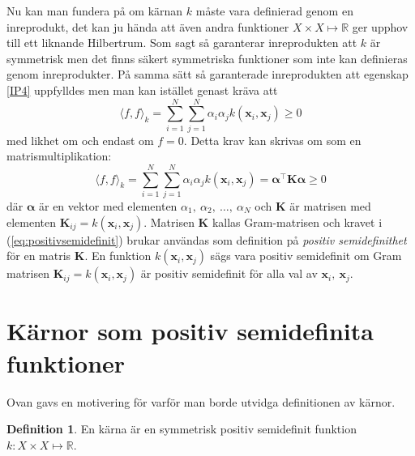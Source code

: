 \documentclass[a4paper, 12pt]{report}
\theoremstyle{definition}
\newtheorem{defi}{Definition}[section]
\theoremstyle{remark}
\newcommand{\bfx}{\mathbf{x}}
\begin{document}
Nu kan man fundera på om kärnan $k$ måste vara definierad genom en inreprodukt, det kan ju hända att även andra funktioner $X \times X \longmapsto \mathbb{R}$ ger upphov till ett liknande Hilbertrum. Som sagt så garanterar inreprodukten att $k$ är symmetrisk men det finns säkert symmetriska funktioner som inte kan definieras genom inreprodukter. På samma sätt så garanterade inreprodukten att egenskap \ref{IP4} uppfylldes men man kan istället genast kräva att
\begin{equation*}
	\langle f, f \rangle_k = \sum_{i=1}^{N}\sum_{j=1}^{N}\alpha_i\alpha_jk\left(\bfx_i,\bfx_j\right) \geq 0
\end{equation*}
med likhet om och endast om $f=0$. Detta krav kan skrivas om som en matrismultiplikation:
\begin{equation}\label{eq:positivsemidefinit}
\langle f, f \rangle_k = \sum_{i=1}^{N}\sum_{j=1}^{N}\alpha_i\alpha_jk\left(\bfx_i,\bfx_j\right) = \boldsymbol{\alpha}^\intercal \mathbf{K} \boldsymbol{\alpha}\geq 0
\end{equation}
där $\boldsymbol{\alpha}$ är en vektor med elementen $\alpha_1,~\alpha_2,~\dots,~\alpha_N$ och $\mathbf{K}$ är matrisen med elementen $\mathbf{K}_{ij}=k\left(\bfx_i,\bfx_j\right)$. Matrisen $\mathbf{K}$ kallas Gram-matrisen och kravet i (\ref{eq:positivsemidefinit}) brukar användas som definition på \emph{positiv semidefinithet} för en matris $\mathbf{K}$. En funktion $k\left(\bfx_i, \bfx_j\right)$ sägs vara positiv semidefinit om Gram matrisen $\mathbf{K}_{ij}=k\left(\bfx_i,\bfx_j\right)$ är positiv semidefinit för alla val av $\bfx_i,~\bfx_j$.
\newpage
\section{Kärnor som positiv semidefinita funktioner}

Ovan gavs en motivering för varför man borde utvidga definitionen av kärnor.
\begin{defi}
	En kärna är en symmetrisk positiv semidefinit funktion $k: X \times X \longmapsto \mathbb{R}$.
\end{defi}
\end{document}
